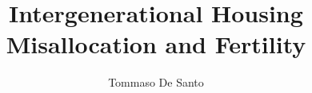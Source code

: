 \documentclass[11pt]{article}
\title{Intergenerational Housing Misallocation and Fertility}
\author{Tommaso De Santo}
\date{}
\theoremstyle{definition}
\newcommand{\1}{\mathbf 1}
\begin{document}
\maketitle

\pagebreak

\newcommand{\mocktodo}[1]{\textcolor{red}{[TODO: #1]}}




\clearpage


\clearpage


\end{document}

